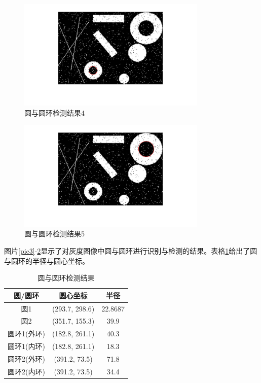 \documentclass[conference]{IEEEtran}
\begin{document}
\begin{figure}[htbp]
	\centerline{
		\includegraphics[width=9cm]{circle5.png} 	
	}
	\caption{圆与圆环检测结果4}
	\label{pic6}
\end{figure}
\begin{figure}[htbp]
	\centerline{
		\includegraphics[width=9cm]{circle6.png} 	
	}
	\caption{圆与圆环检测结果5}
	\label{pic7}
\end{figure}

图片\ref{pic3}-\ref{pic7}显示了对灰度图像中圆与圆环进行识别与检测的结果。表格\ref{table2}给出了圆与圆环的半径与圆心坐标。
\begin{table}[htbp]
	\caption{圆与圆环检测结果}
	\label{table2} 
	\centering  
	\begin{tabular}{|c|c|c|}
	\hline
	圆/圆环 & 圆心坐标 & 半径 \\
	\hline
	圆1 & (293.7, 298.6)  & 22.8687 \\
	\hline
	圆2 & (351.7, 155.3) & 39.9 \\
	\hline
	圆环1(外环) & (182.8, 261.1)  & 40.3 \\
	\hline
	圆环1(内环) & (182.8, 261.1)  & 18.3 \\
	\hline
	圆环2(外环) & (391.2, 73.5)   & 71.8 \\
	\hline
	圆环2(内环) & (391.2, 73.5)   & 34.4 \\
	\hline
	\end{tabular}
\end{table}
\end{document}
